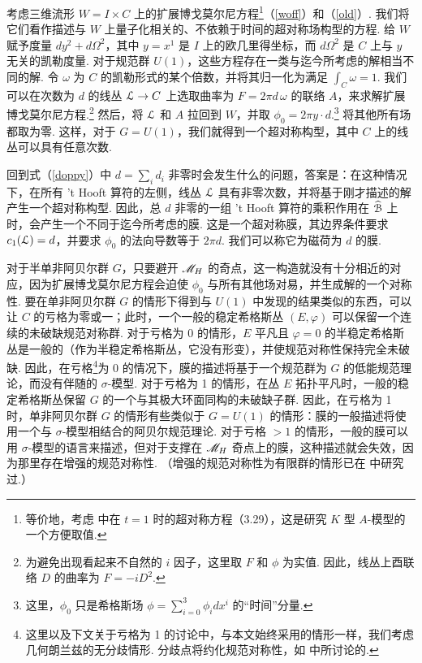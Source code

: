 考虑三维流形 $W=I\times C$ 上的扩展博戈莫尔尼方程\footnote{等价地，考虑 \cite{KW} 中在 $t=1$ 时的超对称方程（3.29），这是研究 $K$ 型 $A$-模型的一个方便取值.}（\ref{woff}）和（\ref{old}）. 我们将它们看作描述与 $W$ 上量子化相关的、不依赖于时间的超对称场构型的方程. 给 $W$ 赋予度量 $dy^2 +d\Omega^2$，其中 $y=x^1$ 是 $I$ 上的欧几里得坐标，而 $d\Omega^2$ 是 $C$ 上与 $y$ 无关的凯勒度量. 对于规范群 $U(1)$，这些方程存在一类与迄今所考虑的解相当不同的解. 令 $\omega$ 为 $C$ 的凯勒形式的某个倍数，并将其归一化为满足 $\int_C\omega = 1$. 我们可以在次数为 $d$ 的线丛 ${\cal L}\to C$ 上选取曲率为 $F=2\pi  d\,\omega$ 的联络 $A$，来求解扩展博戈莫尔尼方程.\footnote{为避免出现看起来不自然的 $i$ 因子，这里取 $F$ 和 $\phi$ 为实值. 因此，线丛上酉联络 $D$ 的曲率为 $F=-iD^2$.} 然后，将 ${\cal L}$ 和 $A$ 拉回到 $W$，并取 $\phi_0=2\pi y\cdot  d$.\footnote{这里，$\phi_0$ 只是希格斯场 $\phi=\sum_{i=0}^3\phi_i dx^i$ 的“时间”分量.} 将其他所有场都取为零. 这样，对于 $G=U(1)$，我们就得到一个超对称构型，其中 $C$ 上的线丛可以具有任意次数.

回到式（\ref{doppy}）中 $d=\sum_id_i$ 非零时会发生什么的问题，答案是：在这种情况下，在所有 't Hooft 算符的左侧，线丛 ${\cal L}$ 具有非零次数，并将基于刚才描述的解产生一个超对称构型. 因此，总 $d$ 非零的一组 't Hooft 算符的乘积作用在 $\hat {\cal B}$ 上时，会产生一个不同于迄今所考虑的膜. 这是一个超对称膜，其边界条件要求 $c_1({\cal L})=d$，并要求 $\phi_0$ 的法向导数等于 $2\pi  d$. 我们可以称它为磁荷为 $d$ 的膜.

对于半单非阿贝尔群 $G$，只要避开 $\MH$ 的奇点，这一构造就没有十分相近的对应，因为扩展博戈莫尔尼方程会迫使 $\phi_0$ 与所有其他场对易，并生成解的一个对称性. 要在单非阿贝尔群 $G$ 的情形下得到与 $U(1)$ 中发现的结果类似的东西，可以让 $C$ 的亏格为零或一；此时，一个一般的稳定希格斯丛 $(E,\varphi)$ 可以保留一个连续的未破缺规范对称群. 对于亏格为 0 的情形，$E$ 平凡且 $\varphi=0$ 的半稳定希格斯丛是一般的（作为半稳定希格斯丛，它没有形变），并使规范对称性保持完全未破缺. 因此，在亏格\footnote{这里以及下文关于亏格为 1 的讨论中，与本文始终采用的情形一样，我们考虑几何朗兰兹的无分歧情形. 分歧点将约化规范对称性，如 \cite{GW} 中所讨论的.}为 0 的情况下，膜的描述将基于一个规范群为 $G$ 的低能规范理论，而没有伴随的 $\sigma$-模型. 对于亏格为 1 的情形，在丛 $E$ 拓扑平凡时，一般的稳定希格斯丛保留 $G$ 的一个与其极大环面同构的未破缺子群. 因此，在亏格为 1 时，单非阿贝尔群 $G$ 的情形有些类似于 $G=U(1)$ 的情形：膜的一般描述将使用一个与 $\sigma$-模型相结合的阿贝尔规范理论. 对于亏格 $>1$ 的情形，一般的膜可以用 $\sigma$-模型的语言来描述，但对于支撑在 $\MH$ 奇点上的膜，这种描述就会失效，因为那里存在增强的规范对称性. （增强的规范对称性为有限群的情形已在 \cite{FW} 中研究过.）


